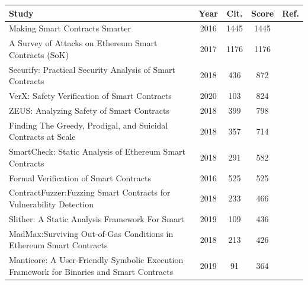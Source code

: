 \documentclass[a4paper,11pt]{article}
\begin{document}
\begin{table}[t]
        \begin{center}
            \small
            \begin{tabular}{||p{11cm}|c|c|c|c||}
                \hline
                Study & Year & Cit. & Score & Ref. \\ 
                \hline
                \hline
                Making Smart Contracts Smarter & 2016  & 1445 & 1445 & \cite{luu2016making} \\
                \hline
                A Survey of Attacks on Ethereum Smart Contracts (SoK) & 2017  & 1176 & 1176 & \cite{atzei2017survey} \\
                \hline
                Securify: Practical Security Analysis of Smart Contracts & 2018  & 436 & 872 & \cite{tsankov2018securify} \\
                \hline
                VerX: Safety Verification of Smart Contracts & 2020  & 103 & 824 & \cite{permenev2020verx} \\
                \hline
                ZEUS: Analyzing Safety of Smart Contracts  & 2018  & 399 & 798 & \cite{kalra2018zeus} \\
                \hline
                Finding The Greedy, Prodigal, and Suicidal Contracts at Scale & 2018  & 357 & 714 & \cite{liu2018reguard} \\
                \hline
                SmartCheck: Static Analysis of Ethereum Smart Contracts & 2018  & 291 & 582 & \cite{tikhomirov2018smartcheck} \\
                \hline
                Formal Verification of Smart Contracts & 2016  & 525 & 525 & \cite{bhargavan2016formal} \\
                \hline
                ContractFuzzer:Fuzzing Smart Contracts for Vulnerability Detection & 2018  & 233 & 466 & \cite{jiang2018contractfuzzer} \\
                \hline
                Slither: A Static Analysis Framework For Smart   & 2019  & 109 & 436 & \cite{feist2019slither} \\
                \hline
                MadMax:Surviving Out-of-Gas Conditions in Ethereum Smart Contracts & 2018  & 213 & 426 & \cite{grech2018madmax} \\
                \hline
                Manticore: A User-Friendly Symbolic Execution Framework for Binaries and Smart Contracts  & 2019  & 91 & 364 & \cite{mossberg2019manticore} \\
                \hline

\end{tabular}
\end{center}
\end{table}
\end{document}
